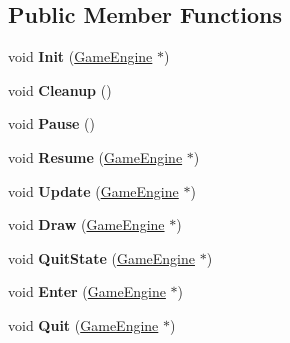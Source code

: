 \subsection*{Public Member Functions}
\begin{DoxyCompactItemize}
\item 
\hypertarget{class_score_state_a1d7c84a61b32590a074ebd8988f89a91}{}void {\bfseries Init} (\hyperlink{class_game_engine}{Game\+Engine} $\ast$)\label{class_score_state_a1d7c84a61b32590a074ebd8988f89a91}

\item 
\hypertarget{class_score_state_a40e90c75f96dd668975f232b3f7163a0}{}void {\bfseries Cleanup} ()\label{class_score_state_a40e90c75f96dd668975f232b3f7163a0}

\item 
\hypertarget{class_score_state_ac25332b7a6b955d5782387a40e2d4af5}{}void {\bfseries Pause} ()\label{class_score_state_ac25332b7a6b955d5782387a40e2d4af5}

\item 
\hypertarget{class_score_state_a360a82fd1e96f1c51b15b18efe13817c}{}void {\bfseries Resume} (\hyperlink{class_game_engine}{Game\+Engine} $\ast$)\label{class_score_state_a360a82fd1e96f1c51b15b18efe13817c}

\item 
\hypertarget{class_score_state_a145192ba32c295a4c18f12246ed8b478}{}void {\bfseries Update} (\hyperlink{class_game_engine}{Game\+Engine} $\ast$)\label{class_score_state_a145192ba32c295a4c18f12246ed8b478}

\item 
\hypertarget{class_score_state_a6105161678611303915f95a9295ff19c}{}void {\bfseries Draw} (\hyperlink{class_game_engine}{Game\+Engine} $\ast$)\label{class_score_state_a6105161678611303915f95a9295ff19c}

\item 
\hypertarget{class_score_state_a582e504a6fe51dbea9c52fcc235efa69}{}void {\bfseries Quit\+State} (\hyperlink{class_game_engine}{Game\+Engine} $\ast$)\label{class_score_state_a582e504a6fe51dbea9c52fcc235efa69}

\item 
\hypertarget{class_score_state_ae7c38459e8b80c0ee517ca8f1e75f4d5}{}void {\bfseries Enter} (\hyperlink{class_game_engine}{Game\+Engine} $\ast$)\label{class_score_state_ae7c38459e8b80c0ee517ca8f1e75f4d5}

\item 
\hypertarget{class_score_state_ae002ecad31a616810733c04aca01798f}{}void {\bfseries Quit} (\hyperlink{class_game_engine}{Game\+Engine} $\ast$)\label{class_score_state_ae002ecad31a616810733c04aca01798f}


\end{DoxyCompactItemize}
